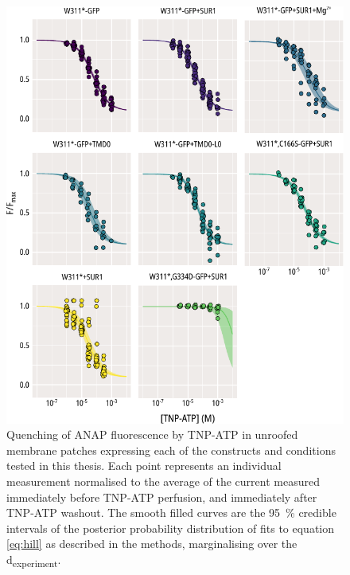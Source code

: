 \begin{figure}[h]
	\centering
	\includegraphics[width=\textwidth]{all_unroofed_fits_1.pdf}
	\caption[Unroofed membrane quenching population hill fits]{
	{\bf{}}
	Quenching of ANAP fluorescence by TNP-ATP in unroofed membrane patches expressing each of the constructs and conditions tested in this thesis.
	Each point represents an individual measurement normalised to the average of the current measured immediately before TNP-ATP perfusion, and immediately after TNP-ATP washout.
	The smooth filled curves are the \SI{95}{\percent} credible intervals of the posterior probability distribution of fits to equation \ref{eq:hill} as described in the methods, marginalising over the \textgreek{d}\textsubscript{experiment}.
	}
	\label{apxfig:unroofed_1}
\end{figure}

